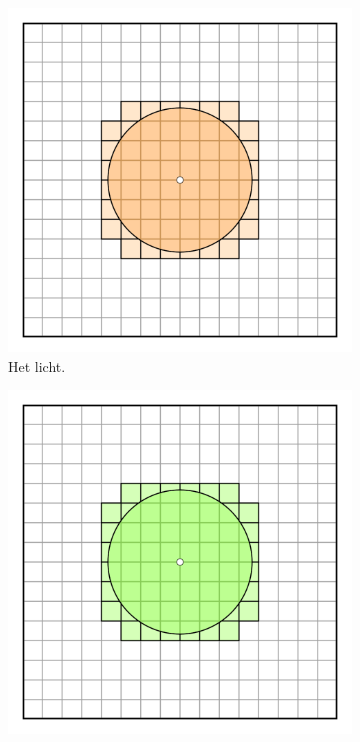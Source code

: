 \begin{figure}[t]
  \centering
  \begin{subfigure}[b]{0.3\textwidth} %
    \includegraphics[width=\textwidth]{./img/raw/dl-transformations/1.png}
    \caption{Het licht.}
    \label{fig:dl-transformaties:base}
  \end{subfigure}%
  \begin{subfigure}[b]{0.3\textwidth}
    \includegraphics[width=\textwidth]{./img/raw/dl-transformations/add.png}

\end{subfigure}
\end{figure}

